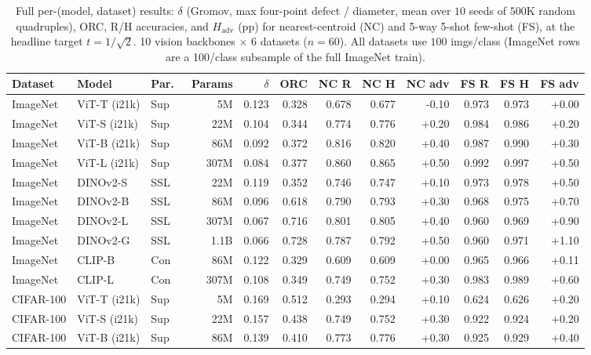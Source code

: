 \begin{table}[!htbp]
\caption{Full per-(model, dataset) results: $\delta$ (Gromov, max four-point defect / diameter, mean over $10$ seeds of $500\mathrm{K}$ random quadruples), ORC, R/H accuracies, and $H_{\mathrm{adv}}$ (pp) for nearest-centroid (NC) and 5-way 5-shot few-shot (FS), at the headline target $t = 1/\sqrt{2}$. 10 vision backbones $\times$ 6 datasets ($n = 60$). All datasets use $100$ imgs/class (ImageNet rows are a 100/class subsample of the full ImageNet train).}
\label{tab:full-results}
\centering\scriptsize
\begin{tabular}{lllrrr|rrr|rrr}
\toprule
Dataset & Model & Par.\ & Params & $\delta$ & ORC & NC R & NC H & NC adv & FS R & FS H & FS adv \\
\midrule
ImageNet & ViT-T (i21k) & Sup & 5M & 0.123 & 0.328 & 0.678 & 0.677 & -0.10 & 0.973 & 0.973 & +0.00 \\
ImageNet & ViT-S (i21k) & Sup & 22M & 0.104 & 0.344 & 0.774 & 0.776 & +0.20 & 0.984 & 0.986 & +0.20 \\
ImageNet & ViT-B (i21k) & Sup & 86M & 0.092 & 0.372 & 0.816 & 0.820 & +0.40 & 0.987 & 0.990 & +0.30 \\
ImageNet & ViT-L (i21k) & Sup & 307M & 0.084 & 0.377 & 0.860 & 0.865 & +0.50 & 0.992 & 0.997 & +0.50 \\
ImageNet & DINOv2-S & SSL & 22M & 0.119 & 0.352 & 0.746 & 0.747 & +0.10 & 0.973 & 0.978 & +0.50 \\
ImageNet & DINOv2-B & SSL & 86M & 0.096 & 0.618 & 0.790 & 0.793 & +0.30 & 0.968 & 0.975 & +0.70 \\
ImageNet & DINOv2-L & SSL & 307M & 0.067 & 0.716 & 0.801 & 0.805 & +0.40 & 0.960 & 0.969 & +0.90 \\
ImageNet & DINOv2-G & SSL & 1.1B & 0.066 & 0.728 & 0.787 & 0.792 & +0.50 & 0.960 & 0.971 & +1.10 \\
ImageNet & CLIP-B & Con & 86M & 0.122 & 0.329 & 0.609 & 0.609 & +0.00 & 0.965 & 0.966 & +0.11 \\
ImageNet & CLIP-L & Con & 307M & 0.108 & 0.349 & 0.749 & 0.752 & +0.30 & 0.983 & 0.989 & +0.60 \\
\midrule
CIFAR-100 & ViT-T (i21k) & Sup & 5M & 0.169 & 0.512 & 0.293 & 0.294 & +0.10 & 0.624 & 0.626 & +0.20 \\
CIFAR-100 & ViT-S (i21k) & Sup & 22M & 0.157 & 0.438 & 0.749 & 0.752 & +0.30 & 0.922 & 0.924 & +0.20 \\
CIFAR-100 & ViT-B (i21k) & Sup & 86M & 0.139 & 0.410 & 0.773 & 0.776 & +0.30 & 0.925 & 0.929 & +0.40 \\

\end{tabular}
\end{table}
